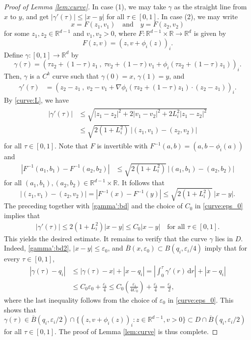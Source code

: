 \documentclass[10pt,a4paper]{amsart}
\newcommand{\R}{\mathbb R}
\renewcommand{\d}{\mathrm d}
\begin{document}
\begin{proof}[Proof of Lemma \ref{lem:curve}]
In case (1), we may take $\gamma$ as the straight line from $x$ to $y$, and get $|\gamma'(\tau)| \le |x-y|$ for all $\tau \in [0,1]$.
In case (2), we may write 
\[
	x = F(z_1,v_1) \quad \text{and} \quad 
	y = F(z_2,v_2)
\]
for some $z_1, z_2 \in \R^{d-1}$ and $v_1,v_2>0$, where $F: \R^{d-1} \times \R \to \R^d$ is given by
\[
	F(z,v) = (z, v+ \phi_i(z))_i.
\]
Define $\gamma: [0,1] \to \R^d$ by
\[
	\gamma(\tau) = (\tau z_2+(1-\tau)z_1 \ ,\  \tau v_2+(1-\tau)v_1 + \phi_i(\tau z_2+(1-\tau)z_1))_i.
\]
Then, $\gamma$ is a $C^k$ curve such that $\gamma(0) = x$, $\gamma(1)=y$, and
\begin{align*}
	\gamma'(\tau) &= ( z_2-z_1\ , \ v_2-v_1 + \nabla \phi_i(\tau z_2+(1-\tau)z_1) \cdot (z_2-z_1) )_i.
\end{align*}
By \eqref{curve:L}, we have
\begin{align}\begin{split}\label{gamma':bd}
	|\gamma'(\tau)| &\le \sqrt{ |z_1-z_2|^2 + 2|v_1-v_2|^2+2L_i^2 |z_1-z_2|^2}\\
	& \le \sqrt{2(1+L_i^2)}\, |(z_1,v_1)-(z_2,v_2)|
\end{split}\end{align}
for all $\tau \in [0,1]$.
Note that $F$ is invertible with $F^{-1}(a,b) = (a,b-\phi_i(a))$ and
\begin{align*}
	|F^{-1}(a_1,b_1) - F^{-1}(a_2,b_2)|
	&\le \sqrt{2(1+L_i^2)}\, |(a_1,b_1)-(a_2,b_2)|
\end{align*}
for all $(a_1,b_1), (a_2,b_2) \in \R^{d-1} \times \R$.
It follows that
\[
	|(z_1,v_1)-(z_2,v_2)| = |F^{-1}(x)-F^{-1}(y)| \le \sqrt{2(1+L_i^2)} \, |x-y|.
\]
The preceding together with \eqref{gamma':bd} and the choice of $C_0$ in \eqref{curve:eps_0} implies that
\begin{align}\label{gamma':bd2}
	|\gamma'(\tau)| \le 2(1+L_i^2) |x-y| \le C_0|x-y| \quad \text{for all $\tau \in [0,1]$.}
\end{align}
This yields the desired estimate.
It remains to verify that the curve $\gamma$ lies in $D$.
Indeed, \eqref{gamma':bd2}, $|x-y| \le \varepsilon_0$, and $\overline{B}(x,\varepsilon_0) \subset B(q_i,\varepsilon_i/4)$ imply that for every $\tau \in [0,1]$, 
\begin{align*}
	|\gamma(\tau)-q_i| &\le |\gamma(\tau)-x| + |x-q_i| = \left|\int_0^\tau \gamma'(r) \, \d r\right| + |x-q_i|\\
	&\le C_0 \varepsilon_0 + \frac{\varepsilon_i}{4}
	\le C_0\left(\frac{\varepsilon_i}{4C_0}\right) + \frac{\varepsilon_i}{4} = \frac{\varepsilon_i}{2},
\end{align*}
where the last inequality follows from the choice of $\varepsilon_0$ in \eqref{curve:eps_0}. This shows that $\gamma(\tau) \in \overline{B}(q_i,\varepsilon_i/2) \cap \{ (z,v+\phi_i(z))_i : z \in \R^{d-1}, v>0 \} \subset D \cap \overline{B}(q_i,\varepsilon_i/2)$ for all $\tau \in [0,1]$.
The proof of Lemma \ref{lem:curve} is thus complete.
\end{proof}
\end{document}
